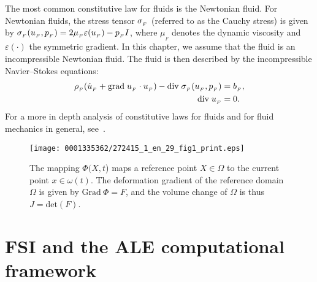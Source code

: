 The most common constitutive law for fluids is the Newtonian fluid.
For Newtonian fluids, the stress tensor $\sigma_{_{F}}$ (referred to as the
Cauchy stress) is given by $\sigma_{_{F}}(u_{_{F}}, p_{_{F}}) = 2\mu_{_{F}}\varepsilon (u_{_{F}}) -
p_{_{F}} I$, where $\mu_{_{F}}$ denotes the dynamic viscosity and
$\varepsilon(\cdot)$ the symmetric gradient. In this chapter, we
assume that the fluid is an incompressible Newtonian fluid. The fluid
is then described by the incompressible Navier--Stokes
equations:\vspace*{-3pt}
\begin{align}
\label{selim:eq:NSmom}
\rho_{_{F}}(\dot{u}_{_{F}} + \textrm{grad}\;u_{_{F}}\cdot u_{_{F}})- \textrm{div}\;
\sigma_{_{F}}(u_{_{F}}, p_{_{F}}) &= b_{_{F}},\\
\label{selim:eq:NScon}
\textrm{div}\; u_{_{F}} &= 0.
\end{align}
For a more in depth analysis of constitutive laws
for fluids and for fluid mechanics in general,
see~\citet{Batchelor1967,Panton1984}.

\begin{figure}[!b]
\centering
\texttt{[image: 0001335362/272415\_1\_en\_29\_fig1\_print.eps]}
\caption{The mapping $\Phi(X,t$) maps a reference point $X\in\Omega$
    to the current point $x\in\omega(t)$. The deformation gradient of
    the reference domain $\Omega$ is given by $\textrm{Grad}\:\Phi =
    F$, and the volume change of $\Omega$ is thus $J = \textrm{det}(F)$.}
\label{selim:fig:mapping}\vspace*{-6pt}
\end{figure}


\section{FSI and the ALE computational framework}
\label{selim:sec:ale}


